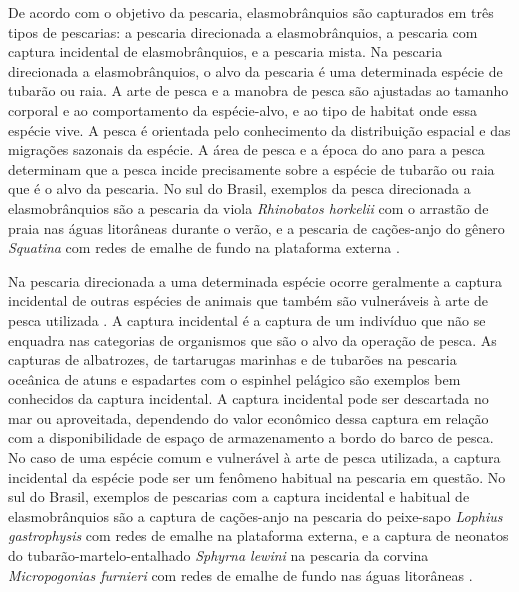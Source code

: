 \documentclass[a4paper,11pt,twoside,showtrims,onecolumn,openright,final]{memoir}
\begin{document}
De acordo com o objetivo da pescaria, elasmobrânquios são capturados em três tipos de pescarias: 
a pescaria direcionada a elasmobrânquios, a pescaria com captura incidental de elasmobrânquios, 
e a pescaria mista. Na pescaria direcionada a elasmobrânquios, o alvo da pescaria é uma determinada 
espécie de tubarão ou raia. A arte de pesca e a manobra de pesca são ajustadas ao tamanho corporal 
e ao comportamento da espécie-alvo, e ao tipo de habitat onde essa espécie vive. A pesca é orientada 
pelo conhecimento da distribuição espacial e das migrações sazonais da espécie. A área de pesca e 
a época do ano para a pesca determinam que  a pesca incide precisamente sobre a espécie de tubarão 
ou raia que é o alvo da pescaria. No sul do Brasil, exemplos da pesca direcionada a elasmobrânquios 
são a pescaria da viola \emph{Rhinobatos horkelii} com o arrastão de praia nas águas litorâneas 
durante o verão, e a pescaria de cações-anjo do gênero \emph{Squatina} com redes de emalhe de fundo 
na plataforma externa \citep[Capítulo~\ref{chap:pesca-industrial}]{lessa1986,ibama1995}. %

Na pescaria direcionada a uma determinada espécie ocorre geralmente  a captura incidental 
de outras espécies de animais que também são vulneráveis à arte de pesca utilizada \citep{dulvy2003}. %
A captura incidental é a captura de um indivíduo que não se enquadra nas categorias de  
organismos que são o alvo da operação de pesca. As capturas de albatrozes, de tartarugas marinhas e 
de tubarões na pescaria oceânica de atuns e espadartes com o espinhel pelágico são exemplos bem conhecidos 
da captura incidental. A captura incidental pode ser descartada no mar ou aproveitada, dependendo do valor 
econômico dessa captura em relação com a disponibilidade de espaço de 
armazenamento a bordo do barco de pesca. No caso de uma espécie comum e vulnerável à arte de pesca utilizada, 
a captura incidental da espécie pode ser um fenômeno habitual na pescaria em questão.  No sul do Brasil, 
exemplos de pescarias com a captura incidental e habitual de elasmobrânquios são a captura de cações-anjo 
na pescaria do peixe-sapo \emph{Lophius gastrophysis} com redes de emalhe na plataforma externa, 
e a captura de neonatos do tubarão-martelo-entalhado \emph{Sphyrna lewini} 
na pescaria da corvina \emph{Micropogonias furnieri} com redes de emalhe de fundo nas 
águas litorâneas \citep[Capítulo~\ref{chap:pesca-industrial}]{hazin2001b}. %
\end{document}
